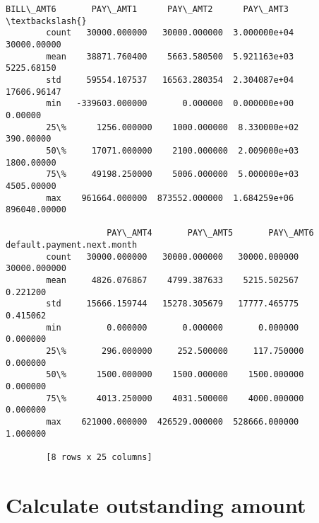 \documentclass[11pt]{article}
\begin{document}
\begin{Verbatim}[commandchars=\\\{\}]
                   BILL\_AMT6       PAY\_AMT1      PAY\_AMT2      PAY\_AMT3  \textbackslash{}
        count   30000.000000   30000.000000  3.000000e+04   30000.00000   
        mean    38871.760400    5663.580500  5.921163e+03    5225.68150   
        std     59554.107537   16563.280354  2.304087e+04   17606.96147   
        min   -339603.000000       0.000000  0.000000e+00       0.00000   
        25\%      1256.000000    1000.000000  8.330000e+02     390.00000   
        50\%     17071.000000    2100.000000  2.009000e+03    1800.00000   
        75\%     49198.250000    5006.000000  5.000000e+03    4505.00000   
        max    961664.000000  873552.000000  1.684259e+06  896040.00000   
        
                    PAY\_AMT4       PAY\_AMT5       PAY\_AMT6  default.payment.next.month  
        count   30000.000000   30000.000000   30000.000000                30000.000000  
        mean     4826.076867    4799.387633    5215.502567                    0.221200  
        std     15666.159744   15278.305679   17777.465775                    0.415062  
        min         0.000000       0.000000       0.000000                    0.000000  
        25\%       296.000000     252.500000     117.750000                    0.000000  
        50\%      1500.000000    1500.000000    1500.000000                    0.000000  
        75\%      4013.250000    4031.500000    4000.000000                    0.000000  
        max    621000.000000  426529.000000  528666.000000                    1.000000  
        
        [8 rows x 25 columns]
\end{Verbatim}
            
    \section{Calculate outstanding
amount}\label{calculate-outstanding-amount}
\end{document}
